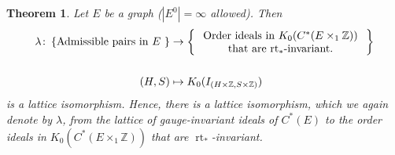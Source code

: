\documentclass[12pt]{amsbook}%
\newcommand{\lt}{\operatorname{rt}}
\newtheorem{theor}{Theorem}[section]
\theoremstyle{defin}
\theoremstyle{remark}
\numberwithin{equation}{chapter}
\numberwithin{theor}{section}
\newcommand{\ZZ}{\mathbb{Z}}
\begin{document}
\begin{theor}\label{thm:admiss-ordideal}
Let $E$ be a graph  ($|E^0|=\infty$ allowed). Then
\begin{align*}
\lambda \colon \left\{ \text{Admissible pairs in $E$ } \right\} &\to  \left\{  \begin{minipage}{.45\textwidth} \begin{center} Order ideals in $K_0 ( C^*( E \times_1 \ZZ ) )$  that are $\lt_*$-invariant.\end{center}\end{minipage}\right\} \\
\\
	(H, S) &\mapsto K_0 ( I_{ (H \times \ZZ , S \times \ZZ ) } )
\end{align*}
is a lattice isomorphism.  Hence, there is a lattice isomorphism, which we again denote by $\lambda$, from the lattice of gauge-invariant ideals of $C^*(E)$ to  
the order ideals in $K_0 ( C^*( E \times_1 \ZZ ) )$  that are $\lt_*$-invariant. 
\end{theor}
\end{document}
